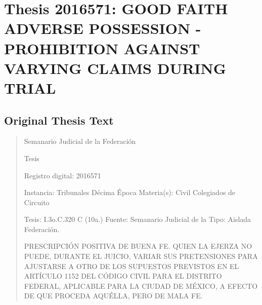 \documentclass[11pt,a4paper]{article}
\begin{document}
\newpage

\section{Thesis 2016571: GOOD FAITH ADVERSE POSSESSION - PROHIBITION AGAINST VARYING CLAIMS DURING TRIAL}
\label{thesis:2016571}

\subsection{Original Thesis Text}

\begin{quote}
                                                   Semanario Judicial de la Federación

                                               Tesis

 Registro digital: 2016571

 Instancia: Tribunales             Décima Época                          Materia(s): Civil
 Colegiados de Circuito

 Tesis: I.3o.C.320 C (10a.)        Fuente: Semanario Judicial de la      Tipo: Aislada
                                   Federación.


PRESCRIPCIÓN POSITIVA DE BUENA FE. QUIEN LA EJERZA NO PUEDE, DURANTE EL
JUICIO, VARIAR SUS PRETENSIONES PARA AJUSTARSE A OTRO DE LOS SUPUESTOS
PREVISTOS EN EL ARTÍCULO 1152 DEL CÓDIGO CIVIL PARA EL DISTRITO FEDERAL,
APLICABLE PARA LA CIUDAD DE MÉXICO, A EFECTO DE QUE PROCEDA AQUÉLLA, PERO
DE MALA FE.



\end{quote}
\end{document}
